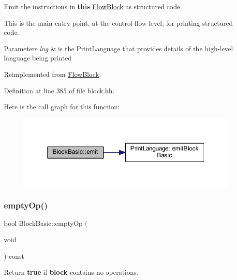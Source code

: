 Emit the instructions in {\bfseries{this}} \mbox{\hyperlink{class_flow_block}{Flow\+Block}} as structured code. 

This is the main entry point, at the control-\/flow level, for printing structured code. 
\begin{DoxyParams}{Parameters}
{\em lng} & is the \mbox{\hyperlink{class_print_language}{Print\+Language}} that provides details of the high-\/level language being printed \\
\hline
\end{DoxyParams}


Reimplemented from \mbox{\hyperlink{class_flow_block_a9baddec2635c95a5ac9019d6b21d3eab}{Flow\+Block}}.



Definition at line 385 of file block.\+hh.

Here is the call graph for this function\+:
\nopagebreak
\begin{figure}[H]
\begin{center}
\leavevmode
\includegraphics[width=335pt]{class_block_basic_a0b163426cb08cdecdcdd7305ecc6381e_cgraph}
\end{center}
\end{figure}
\mbox{\label{class_block_basic_aedf26d0f0560d601eb54fb7303518545}} 
\subsubsection{\texorpdfstring{emptyOp()}{emptyOp()}}
{\footnotesize\ttfamily bool Block\+Basic\+::empty\+Op (\begin{DoxyParamCaption}\item[{void}]{ }\end{DoxyParamCaption}) const\hspace{0.3cm}{\ttfamily [inline]}}



Return {\bfseries{true}} if {\bfseries{block}} contains no operations. 




